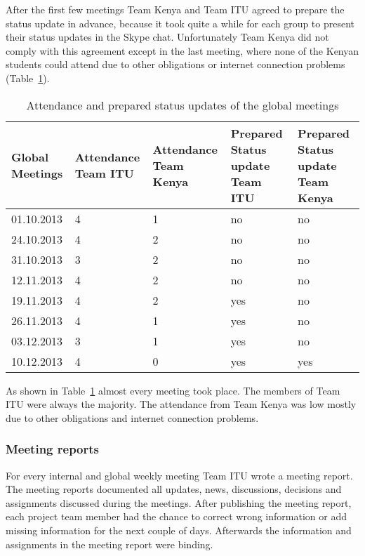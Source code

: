 After the first few meetings Team Kenya and Team ITU agreed to prepare the status update in advance, because it took quite a while for each group to present their status updates in the Skype chat. Unfortunately Team Kenya did not comply with this agreement except in the last meeting, where none of the Kenyan students could attend due to other obligations or internet connection problems (Table~\ref{tab:global_meetings}).

\begin{table}[htb]
	\centering
	\begin{tabular}{ | l |  p{2.5cm} |  p{2.5cm} |  p{3cm} |  p{3cm} |}
    		\hline
   		Global Meetings & Attendance Team ITU &  Attendance Team Kenya & Prepared Status update Team ITU & Prepared Status update Team Kenya\\ \hline
    		01.10.2013 & 4 & 1 & no & no \\ \hline
    		24.10.2013 & 4 & 2 & no & no \\ \hline
    		31.10.2013 & 3 & 2 & no & no \\ \hline
    		12.11.2013 & 4 & 2 & no & no \\ \hline
    		19.11.2013 & 4 & 2 & yes & no \\ \hline
    		26.11.2013 & 4 & 1 & yes & no \\ \hline
    		03.12.2013 & 3 & 1 & yes & no \\ \hline
    		10.12.2013 & 4 & 0 & yes & yes \\ \hline
	\end{tabular}
	\caption{Attendance and prepared status updates of the global meetings}
	\label{tab:global_meetings}
\end{table}

As shown in Table~\ref{tab:global_meetings} almost every meeting took place. The members of Team ITU were always the majority. The attendance from Team Kenya was low mostly due to other obligations and internet connection problems.


\subsubsection {Meeting reports}
\label{sec:meeting_report}
For every internal and global weekly meeting Team ITU wrote a meeting report. The meeting reports documented all updates, news, discussions, decisions and assignments discussed during the meetings. After publishing the meeting report, each project team member had the chance to correct wrong information or add missing information for the next couple of days. Afterwards the information and assignments in the meeting report were binding.

